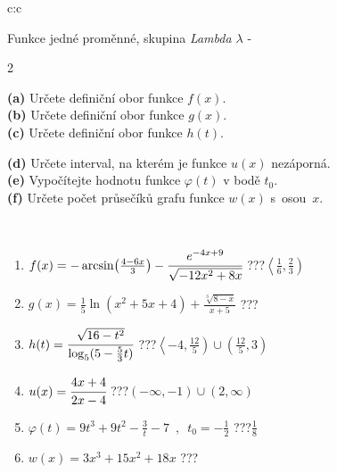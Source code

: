 \documentclass[10pt]{report}
\begin{document}
\begin{tabular}{c:c}
\begin{minipage}[c][104.5mm][t]{0.5\linewidth}
\begin{center}
{\huge Funkce jedné proměnné, skupina \textit{Lambda $\lambda$} -}\\[5mm]
\begin{minipage}{0.95\linewidth}
\begin{center}
{\small \begin{multicols}{2} \raggedright
\textbf{(a)} Určete definiční obor funkce \(f(x)\). \\[1mm]
\textbf{(b)} Určete definiční obor funkce \(g(x)\). \\[1mm]
\textbf{(c)} Určete definiční obor funkce \(h(t)\). \par \columnbreak
\textbf{(d)} Určete interval, na kterém je funkce \(u(x)\) nezáporná. \\[1mm]
\textbf{(e)} Vypočítejte hodnotu funkce \(\varphi(t)\) v bodě \(t_0\). \\[1mm]
\textbf{(f)} Určete počet průsečíků grafu funkce \(w(x)\) s~osou~\(x\). \\[1mm]
\end{multicols}
}
\end{center}
\end{minipage}
\\[4mm]
\begin{minipage}{0.79\linewidth}
\begin{center}
\begin{varwidth}{\linewidth}
\begin{enumerate}
\small
\item $f(x) = -\arcsin\!\left( \frac{4-6x}{3} \right) - \cfrac{e^{-4x+9}}{\sqrt{-12x^2+8x}}$\quad \dotfill\; ???\;\dotfill \quad $\left\langle\frac{1}{6} , \frac{2}{3}\right)$
\item $g(x) = \frac{1}{5} \ln{\!(x^2+5x+4)}+\frac{\sqrt[3]{8-x}}{x+5}$\quad \dotfill\; ???\;\dotfill {}
\item $h(t) = \cfrac{\sqrt{16-t^2}}{\log_5(5-\frac{5}{3}t)}$\quad \dotfill\; ???\;\dotfill \quad $\left\langle-4 , \frac{12}{5}\right)\cup\left(\frac{12}{5} , 3\right)$
\item $u(x) = \cfrac{4x+4}{2x-4}$\quad \dotfill\; ???\;\dotfill \quad $\left(-\infty , -1\right)\cup\left(2 , \infty\right)$
\item $\varphi(t) = 9t^3+9t^2-\frac{3}{t}-7 \enspace , \enspace t_0=-\frac{1}{2}$\quad \dotfill\; ???\;\dotfill \quad $\frac{1}{8}$
\item $w(x) = 3x^3+15x^2+18x$\quad \dotfill\; ???\;\dotfill {}

\end{enumerate}
\end{varwidth}
\end{center}
\end{minipage}
\end{center}
\end{minipage}
\end{tabular}
\end{document}
